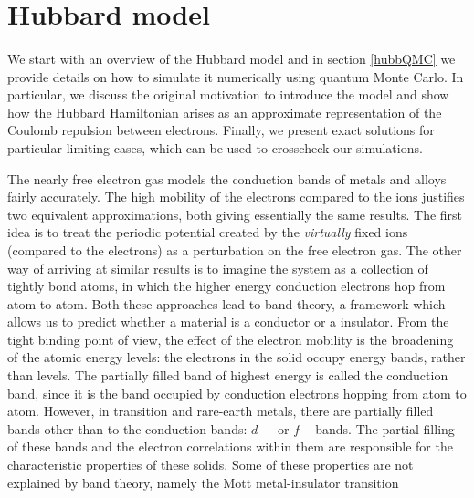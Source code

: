\documentclass[10pt, twocolumn, twoside]{article}
\begin{document}
\section{Hubbard model}\paragraph{}

We start with an overview of the Hubbard model and in section \ref{hubbQMC} we provide details on how to simulate it numerically using quantum Monte Carlo. In particular, we discuss the original motivation to introduce the model and show how the Hubbard Hamiltonian arises as an approximate representation of the Coulomb repulsion between electrons. Finally, we present exact solutions for particular limiting cases, which can be used to crosscheck our simulations.

The nearly free electron gas models the conduction bands of metals and alloys fairly accurately. The high mobility of the electrons compared to the ions justifies two equivalent approximations, both giving essentially the same results\cite{Ashcroft1976}. The first idea is to treat the periodic potential created by the \emph{virtually} fixed ions (compared to the electrons) as a perturbation on the free electron gas. The other way of arriving at similar results is to imagine the system as a collection of tightly bond atoms, in which the higher energy conduction electrons hop from atom to atom. Both these approaches lead to band theory, a framework which allows us to predict whether a material is a conductor or a insulator. From the tight binding point of view, the effect of the electron mobility is the broadening of the atomic energy levels: the electrons in the solid occupy energy bands, rather than levels. The partially filled band of highest energy is called the conduction band, since it is the band occupied by conduction electrons hopping from atom to atom. However, in transition and rare-earth metals, there are partially filled bands other than to the conduction bands: $d-$ or $f-$bands. The partial filling of these bands and the electron correlations within them are responsible for the characteristic properties of these solids. Some of these properties are not explained by band theory, namely the Mott metal-insulator transition\cite{Boer1937, Mott1939, Mott1949}
\end{document}
